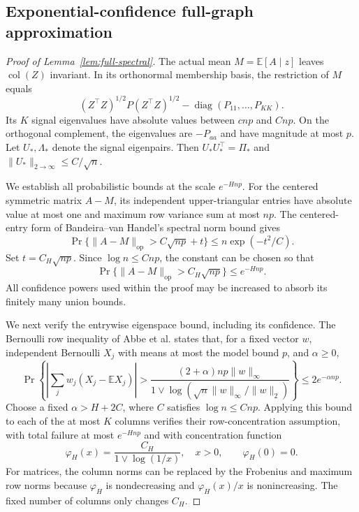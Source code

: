 \subsection{Exponential-confidence full-graph approximation}
\label{app:general-full-spectral}

\begin{proof}[Proof of Lemma~\ref{lem:full-spectral}]
The actual mean $M=\mathbb E[A\mid z]$ leaves
$\operatorname{col}(Z)$ invariant.  In its orthonormal membership
basis, the restriction of $M$ equals
\[
 (Z^\top Z)^{1/2}P(Z^\top Z)^{1/2}
       -\operatorname{diag}(P_{11},\ldots,P_{KK}).
\]
Its $K$ signal eigenvalues have absolute values between $cnp$ and
$Cnp$.  On the orthogonal complement, the eigenvalues are
$-P_{aa}$ and have magnitude at most $p$.
Let $U_*,\Lambda_*$ denote the signal eigenpairs.  Then
$U_*U_*^\top=\Pi_*$ and
$\|U_*\|_{2\to\infty}\le C/\sqrt n$.

We establish all probabilistic bounds at the scale $e^{-Hnp}$.
For the centered symmetric matrix $A-M$, its independent
upper-triangular entries have absolute value at most one and
maximum row variance sum at most $np$.  The centered-entry form of
Bandeira--van Handel's spectral norm bound
\citep[Corollary 3.12 and Remark 3.13]{bandeiravhandel2016} gives
\[
 \Pr\{\|A-M\|_{\mathrm{op}}>C\sqrt{np}+t\}
       \le n\exp(-t^2/C).
\]
Set $t=C_H\sqrt{np}$.  Since $\log n\le Cnp$, the constant can
be chosen so that
\begin{equation}
 \Pr\{\|A-M\|_{\mathrm{op}}>C_H\sqrt{np}\}
       \le e^{-Hnp}.
 \label{eq:exponential-spectral-norm}
\end{equation}
All confidence powers used within the proof may be increased to
absorb its finitely many union bounds.

We next verify the entrywise eigenspace bound, including its
confidence.  The Bernoulli row inequality of Abbe et al.
\citep[Lemma 7]{abbe2020} states that, for a fixed vector $w$,
independent Bernoulli $X_j$ with means at most the model bound $p$, and $\alpha\ge0$,
\[
 \Pr\left\{\left|\sum_jw_j(X_j-\mathbb EX_j)\right|
  >\frac{(2+\alpha)np\|w\|_\infty}
   {1\vee\log(\sqrt n\|w\|_\infty/\|w\|_2)}\right\}
       \le2e^{-\alpha np}.
\]
Choose a fixed $\alpha>H+2C$, where $C$ satisfies $\log n\le Cnp$.
Applying this bound to each of the at most
$K$ columns verifies their row-concentration assumption, with
total failure at most $e^{-Hnp}$ and with concentration function
\[
 \varphi_H(x)=\frac{C_H}{1\vee\log(1/x)},\quad x>0,
 \qquad \varphi_H(0)=0.
\]
For matrices, the column norms can be replaced by the Frobenius
and maximum row norms because $\varphi_H$ is nondecreasing and
$\varphi_H(x)/x$ is nonincreasing.  The fixed number of columns
only changes $C_H$.


\end{proof}
